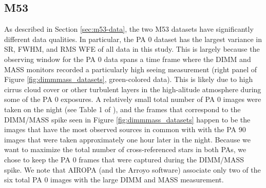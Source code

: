 \documentclass[]{spie}  %
\begin{document}
\subsection{M53} \label{sec:results-m53}
As described in Section \ref{sec:m53-data}, the two M53 datasets have significantly different data qualities. In particular, the PA 0 dataset has the largest variance in SR, FWHM, and RMS WFE of all data in this study. This is largely because the observing window for the PA 0 data spans a time frame where the DIMM and MASS monitors recorded a particularly high seeing measurement (right panel of Figure \ref{fig:dimmmass_datasets}, green-colored data). This is likely due to high cirrus cloud cover or other turbulent layers in the high-alitude atmosphere during some of the PA 0 exposures. A relatively small total number of PA 0 images were taken on the night (see Table 1 of \cite{service:2016a}), and the frames that correspond to the DIMM/MASS spike seen in Figure \ref{fig:dimmmass_datasets} happen to be the images that have the most observed sources in common with with the PA 90 images that were taken approximately one hour later in the night. Because we want to maximize the total number of cross-referenced stars in both PAs, we chose to keep the PA 0 frames that were captured during the DIMM/MASS spike. We note that AIROPA (and the Arroyo software) associate only two of the six total PA 0 images with the large DIMM and MASS measurement.
\end{document}

